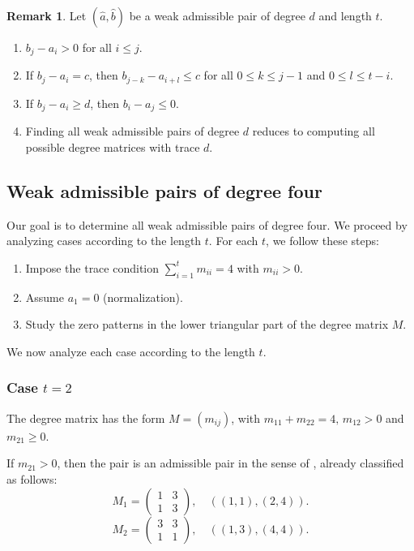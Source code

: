 \documentclass[12pt,reqno]{amsart}
\theoremstyle{plain}
\theoremstyle{definition}
\newtheorem{rmk}[theorem]{Remark}
\theoremstyle{remark}
\theoremstyle{definition}
\begin{document}
\begin{rmk} \label{Obsparejas}
Let $(\hat{a}, \hat{b})$ be a weak admissible pair of degree $d$ and length $t$.
\begin{enumerate}
    \item $b_{j}-a_{i}>0$ for all $i\leq j$.
    \item If $b_{j}-a_{i}=c$, then $b_{j-k}-a_{i+l}\leq c$ for all $0\leq k\leq j-1$ and $0\leq l \leq t-i$.
    \item If $b_{j}-a_{i}\geq d$, then $b_{i}-a_{j}\leq 0$.
    \item Finding all weak admissible pairs of degree $d$ reduces to computing all possible degree matrices with trace $d$.
\end{enumerate}
\end{rmk}

\subsection{Weak admissible pairs of degree four}

Our goal is to determine all weak admissible pairs of degree four. We proceed by analyzing cases according to the length $t$. For each $t$, we follow these steps:
\begin{enumerate}[label=(\roman*)]
    \item Impose the trace condition $\sum_{i=1}^t m_{ii}=4$ with $m_{ii}>0$.
    \item Assume $a_1=0$ (normalization).
    \item Study the zero patterns in the lower triangular part of the degree matrix $M$.
\end{enumerate}

\vskip2mm
\noindent We now analyze each case according to the length $t$.

\subsubsection{\textbf{Case $t=2$}}

The degree matrix has the form $M=(m_{ij})$, with $m_{11}+m_{22}=4,\, m_{12}>0$ and $m_{21}\geq 0.$

If $m_{21}>0$, then the pair is an admissible pair in the sense of \cite{LLV}, already classified as follows:
$$ M_{1}=\left( \begin{array}{cc}
1 & 3\\
1 & 3
\end{array}
    \right)  ,\quad ((1,1),(2,4)).$$
  $$ M_{2}=\left( \begin{array}{cc}
3 & 3\\
1 & 1
\end{array}
    \right)  ,\quad ((1,3),(4,4)). $$  
\end{document}

